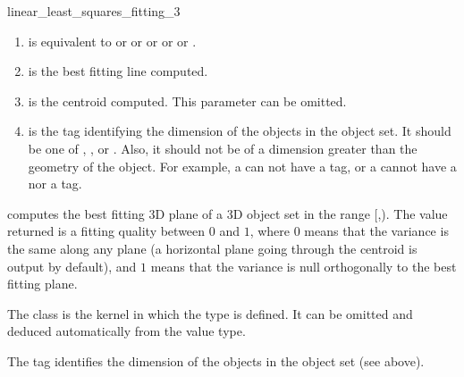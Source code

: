 \begin{ccRefFunction}{linear_least_squares_fitting_3}

\begin{enumerate}
   \item  {} is equivalent to  or
           or  or  or
           or .
   \item  {} is the best fitting line computed.
   \item  {} is the centroid computed. This parameter can be
          omitted.
   \item  {} is the tag identifying the dimension of the objects in the object set. It should be one of , ,  or . Also, it should not be of a dimension greater than the geometry of the object. For example, a  can not have a  tag, or a  cannot have a  nor a  tag.
\end{enumerate}


{ computes the best fitting 3D plane of a 3D object set in the range
[,). The value returned is a fitting quality
between $0$ and $1$, where $0$ means that the variance is the same
along any plane (a horizontal plane going through the centroid is output
by default), and $1$ means that the variance is null orthogonally
to the best fitting plane. }

The class  is the kernel in which the type
 is defined. It can be omitted and
deduced automatically from the value type.

The tag  identifies the dimension of the objects in the object set (see above). 



\end{ccRefFunction}
